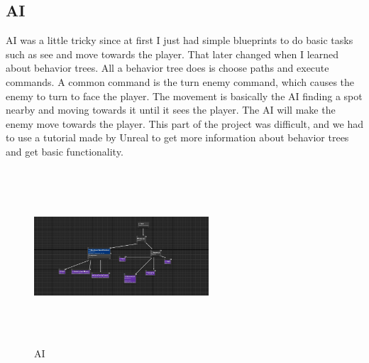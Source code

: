 \documentclass{sigchi}
\begin{document}
\subsection{AI}
AI was a little tricky since at first I just had simple blueprints to do basic tasks such as see and move towards the player. That later changed when I learned about behavior trees. All a behavior tree does is choose paths and execute commands. A common command is the turn enemy command, which causes the enemy to turn to face the player. The movement is basically the AI finding a spot nearby and moving towards it until it sees the player. The AI will make the enemy move towards the player. This part of the project was difficult, and we had to use a tutorial made by Unreal to get more information about behavior trees and get basic functionality.
\begin{figure}


\includegraphics[width=6.5cm, height=6.5cm]{Figure/AI.png}  
\caption{AI}
\end{figure}
\end{document}
